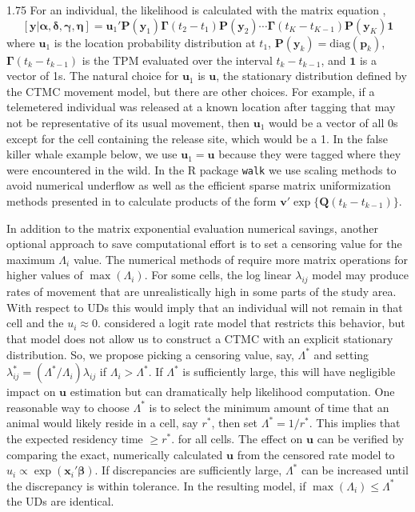 \documentclass[12pt]{article}
\newcommand{\by}{\ensuremath{\mathbf{y}}}
\newcommand{\bx}{\ensuremath{\mathbf{x}}}
\newcommand{\bQ}{\ensuremath{\mathbf{Q}}}
\newcommand{\bu}{\ensuremath{\mathbf{u}}}
\newcommand{\bp}{\ensuremath{\mathbf{p}}}
\newcommand{\bP}{\ensuremath{\mathbf{P}}}
\newcommand{\bb}{\ensuremath{\boldsymbol{\beta}}}
\newcommand{\bg}{\ensuremath{\boldsymbol{\gamma}}}
\newcommand{\bG}{\ensuremath{\boldsymbol{\Gamma}}}
\newcommand{\ba}{\ensuremath{\boldsymbol{\alpha}}}
\newcommand{\bd}{\ensuremath{\boldsymbol{\delta}}}
\newcommand{\bn}{\ensuremath{\boldsymbol{\eta}}}
\begin{document}
\begin{spacing}{1.75}
For an individual, the likelihood is calculated with the matrix equation \citep{zucchini2016hidden, mcclintock2020uncovering},
\begin{equation}
\label{eq.lik}
[\by|\ba,\bd,\bg,\bn] = \bu_1'\bP(\by_1)\bG(t_2-t_1)\bP(\by_2)\cdots\bG(t_{K}-t_{K-1})\bP(\by_K)\mathbf{1}
\end{equation}
where $\bu_1$ is the location probability distribution at $t_1$, $\bP(\by_k) = \text{diag}(\bp_k)$, $\bG(t_k-t_{k-1})$ is the TPM evaluated over the interval $t_k-t_{k-1}$, and $\mathbf{1}$ is a vector of 1s. The natural choice for $\bu_1$ is $\bu$, the stationary distribution defined by the CTMC movement model, but there are other choices. For example, if a telemetered individual was released at a known location after tagging that may not be representative of its usual movement, then $\bu_1$ would be a vector of all 0s except for the cell containing the release site, which would be a 1. In the false killer whale example below, we use $\bu_1=\bu$ because they were tagged where they were encountered in the wild. In the R package {\tt walk} we use scaling methods to avoid numerical underflow as well as the efficient sparse matrix uniformization methods presented in  \cite{sherlock2021direct} to calculate products of the form $\mathbf{v}'\exp\{\bQ(t_k-t_{k-1})\}$.

In addition to the matrix exponential evaluation numerical savings, another optional approach to save computational effort is to set a censoring value for the maximum $\Lambda_i$ value. The numerical methods of \cite{sherlock2021direct} require more matrix operations for higher values of $\max(\Lambda_i)$. For some cells, the log linear $\lambda_{ij}$ model may produce rates of movement that are unrealistically high in some parts of the study area. With respect to UDs this would imply that an individual will not remain in that cell and the $u_i \approx 0$. \cite{Hewitt:2023aa} considered a logit rate model that restricts this behavior, but that model does not allow us to construct a CTMC with an explicit stationary distribution. So, we propose picking a censoring value, say, $\Lambda^*$ and setting $\lambda_{ij}^* = (\Lambda^*/\Lambda_i)\lambda_{ij}$
if $\Lambda_i > \Lambda^*$. If $\Lambda^*$ is sufficiently large, this will have negligible impact on $\bu$ estimation but can dramatically help likelihood computation. One reasonable way to choose $\Lambda^*$ is to select the minimum amount of time that an animal would likely reside in a cell, say $r^*$, then set $\Lambda^* = 1/r^*$. This implies that the expected residency time $\ge r^*$. for all cells. The effect on $\bu$ can be verified by comparing the exact, numerically calculated $\bu$ from the censored rate model \citep{wilsonestimating} to $u_i \propto \exp(\bx_i'\bb)$. If discrepancies are sufficiently large, $\Lambda^*$ can be increased until the discrepancy is within tolerance. In the resulting model, if $\max(\Lambda_i) \le \Lambda^*$ the UDs are identical. 


\end{spacing}
\end{document}
